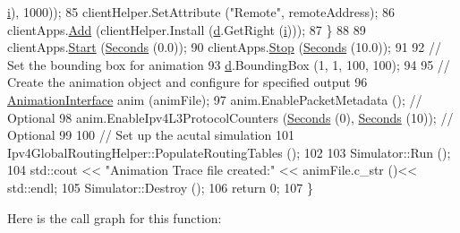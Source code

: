 \begin{DoxyCode}
      \hyperlink{bernuolliDistribution_8m_a6f6ccfcf58b31cb6412107d9d5281426}{i}), 1000));
85       clientHelper.SetAttribute (\textcolor{stringliteral}{"Remote"}, remoteAddress);
86       clientApps.\hyperlink{classns3_1_1ApplicationContainer_ad09ab1a1ad5849d518d5f4c262e38152}{Add} (clientHelper.Install (\hyperlink{buildings__pathloss_8m_a9f9b934daed17a4d3613b6886ff4cf4b}{d}.GetRight (\hyperlink{bernuolliDistribution_8m_a6f6ccfcf58b31cb6412107d9d5281426}{i})));
87     \}
88 
89   clientApps.\hyperlink{classns3_1_1ApplicationContainer_a8eff87926507020bbe3e1390358a54a7}{Start} (\hyperlink{group__timecivil_ga33c34b816f8ff6628e33d5c8e9713b9e}{Seconds} (0.0));
90   clientApps.\hyperlink{classns3_1_1ApplicationContainer_adfc52f9aa4020c8714679b00bbb9ddb3}{Stop} (\hyperlink{group__timecivil_ga33c34b816f8ff6628e33d5c8e9713b9e}{Seconds} (10.0));
91 
92   \textcolor{comment}{// Set the bounding box for animation}
93   \hyperlink{buildings__pathloss_8m_a9f9b934daed17a4d3613b6886ff4cf4b}{d}.BoundingBox (1, 1, 100, 100);
94 
95   \textcolor{comment}{// Create the animation object and configure for specified output}
96   \hyperlink{classns3_1_1AnimationInterface}{AnimationInterface} anim (animFile);
97   anim.EnablePacketMetadata (); \textcolor{comment}{// Optional}
98   anim.EnableIpv4L3ProtocolCounters (\hyperlink{group__timecivil_ga33c34b816f8ff6628e33d5c8e9713b9e}{Seconds} (0), \hyperlink{group__timecivil_ga33c34b816f8ff6628e33d5c8e9713b9e}{Seconds} (10)); \textcolor{comment}{// Optional}
99   
100   \textcolor{comment}{// Set up the acutal simulation}
101   Ipv4GlobalRoutingHelper::PopulateRoutingTables ();
102 
103   Simulator::Run ();
104   std::cout << \textcolor{stringliteral}{"Animation Trace file created:"} << animFile.c\_str ()<< std::endl;
105   Simulator::Destroy ();
106   \textcolor{keywordflow}{return} 0;
107 \}
\end{DoxyCode}


Here is the call graph for this function\+:


